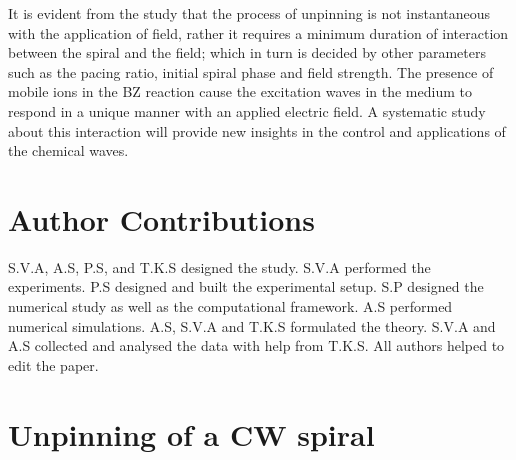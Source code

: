\documentclass[%
 preprint,
 amsmath,amssymb,
 aps,
]{revtex4-2}
\begin{document}
It is evident from the study that the process of unpinning is not instantaneous with the application of field, rather it requires a minimum duration of interaction between the spiral and the field; which in turn is decided by other parameters such as the pacing ratio, initial spiral phase and field strength.
The presence of mobile ions in the BZ reaction cause the excitation waves in the medium to respond in a unique manner with an applied electric field. A systematic study about this interaction will provide new insights in the control and applications of the chemical waves.



\begin{acknowledgments}

\end{acknowledgments}

\section{Author Contributions}
S.V.A, A.S, P.S, and T.K.S designed the study. S.V.A performed the experiments. P.S designed and built the experimental setup. S.P designed the numerical study as well as the computational framework. A.S performed numerical simulations. A.S, S.V.A and T.K.S formulated the theory. S.V.A and A.S collected and analysed the data with help from T.K.S. All authors helped to edit the paper. 


\appendix
\iffalse
\section{Unpinning of a CW spiral}
\end{document}
